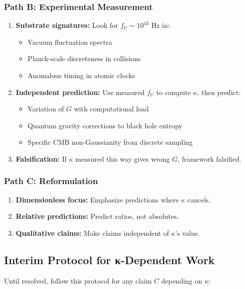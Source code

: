 \subsubsection{Path B: Experimental Measurement}
\begin{enumerate}
\item \textbf{Substrate signatures:} Look for $f_U \sim 10^{43}$ Hz in:
\begin{itemize}
\item Vacuum fluctuation spectra
\item Planck-scale discreteness in collisions
\item Anomalous timing in atomic clocks
\end{itemize}

\item \textbf{Independent prediction:} Use measured $f_U$ to compute $\kappa$, then predict:
\begin{itemize}
\item Variation of $G$ with computational load
\item Quantum gravity corrections to black hole entropy
\item Specific CMB non-Gaussianity from discrete sampling
\end{itemize}

\item \textbf{Falsification:} If $\kappa$ measured this way gives wrong $G$, framework falsified.
\end{enumerate}

\subsubsection{Path C: Reformulation}
\begin{enumerate}
\item \textbf{Dimensionless focus:} Emphasize predictions where $\kappa$ cancels.
\item \textbf{Relative predictions:} Predict ratios, not absolutes.
\item \textbf{Qualitative claims:} Make claims independent of $\kappa$'s value.
\end{enumerate}

\subsection{Interim Protocol for κ-Dependent Work}

Until resolved, follow this protocol for any claim $C$ depending on $\kappa$:

